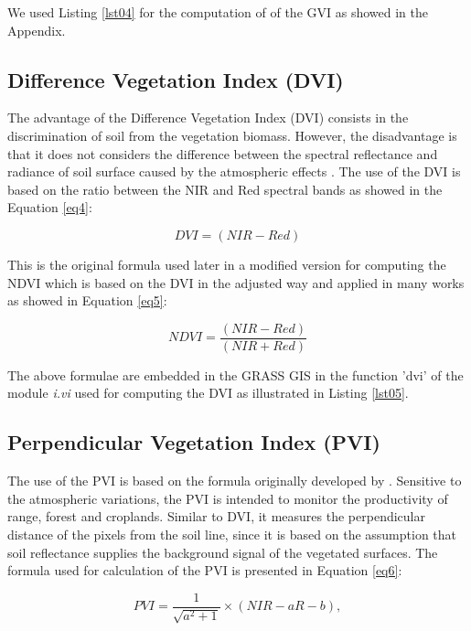 \documentclass[jmse,article,submit,pdftex,moreauthors]{Definitions/mdpi}
\begin{document}
We used Listing \ref{lst04} for the computation of of the GVI as showed in the Appendix.

\subsection{Difference Vegetation Index (DVI)}

The advantage of the Difference Vegetation Index (DVI) consists in the discrimination of soil from the vegetation biomass. However, the disadvantage is that it does not considers the difference between the spectral reflectance and radiance of soil surface caused by the atmospheric effects \cite{TUCKER1979127}. The use of the DVI is based on the ratio between the NIR and Red spectral bands \cite{Naji2018} as showed in the Equation \ref{eq4}:

\begin{equation}\label{eq4}
	DVI = (NIR - Red)
\end{equation}

This is the original formula used later in a modified version for computing the NDVI which is based on the DVI in the adjusted way and applied in many works \cite{TUCKER1979237,RONDEAUX199695,DATT1998111} as showed in Equation \ref{eq5}:

\begin{equation}\label{eq5}
	NDVI = \frac{(NIR - Red)}{(NIR + Red)}
\end{equation}

The above formulae are embedded in the GRASS GIS in the function 'dvi' of the module \emph{i.vi} used for computing the DVI as illustrated in Listing \ref{lst05}.

\subsection{Perpendicular Vegetation Index (PVI)}

The use of the PVI is based on the formula originally developed by \cite{Richardson}. Sensitive to the atmospheric variations, the PVI is intended to monitor the productivity of range, forest and croplands. Similar to DVI, it measures the perpendicular distance of the pixels from the soil line, since it is based on the assumption that soil reflectance supplies the background signal of the vegetated surfaces. The formula used for calculation of the PVI is presented in Equation \ref{eq6}:

\begin{equation}\label{eq6}
	PVI=\frac{1}{\sqrt{a^2+1}} \times (NIR - aR - b),
\end{equation} 
\end{document}
